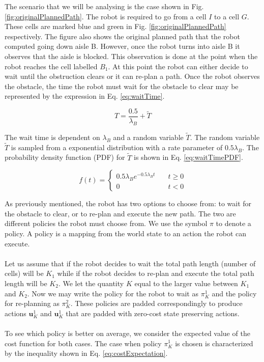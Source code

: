 \documentclass[a4paper,12pt]{article}
\begin{document}
			The scenario that we will be analysing is the case shown in Fig. \ref{fig:originalPlannedPath}. The robot is required to go from a cell $I$ to a cell $G$. These cells are marked blue and green in Fig. \ref{fig:originalPlannedPath} respectively. The figure also shows the original planned path that the robot computed going down aisle B. However, once the robot turns into aisle B it observes that the aisle is blocked. This observation is done at the point when the robot reaches the cell labelled $B_{1}$. At this point the robot can either decide to wait until the obstruction clears or it can re-plan a path. Once the robot observes the obstacle, the time the robot must wait for the obstacle to clear may be represented by the expression in Eq. \ref{eq:waitTime}. 

			\begin{equation}
				T=\frac{0.5}{\lambda_{B}}+\widetilde{T}
				\label{eq:waitTime}
			\end{equation}

			The wait time is dependent on $\lambda_{B}$ and a random variable $\widetilde{T}$. The random variable $\widetilde{T}$ is sampled from a exponential distribution with a rate parameter of $0.5\lambda_{B}$. The probability density function (PDF) for $\widetilde{T}$ is shown in Eq. \ref{eq:waitTimePDF}. 

			\begin{equation}
				f(t) = \left\{
				\begin{array}{ll}
					0.5\lambda_{B} e^{-0.5\lambda_{B} t} & \quad t \geq 0 \\
					0 & \quad t < 0
				\end{array}
				\right.
				\label{eq:waitTimePDF}
			\end{equation}

			As previously mentioned, the robot has two options to choose from: to wait for the obstacle to clear, or to re-plan and execute the new path. The two are different policies the robot must choose from. We use the symbol $\pi$ to denote a policy. A policy is a mapping from the world state to an action the robot can execute.
			\\
			\\
			Let us assume that if the robot decides to wait the total path length (number of cells) will be $K_1$ while if the robot decides to re-plan and execute the total path length will be $K_2$. We let the quantity $K$ equal to the larger value between $K_1$ and $K_2$. Now we may write the policy for the robot to wait as $\pi_{K}^{1}$ and the policy for re-planning as $\pi_{K}^{2}$. These policies are padded correspondingly to produce actions $\textbf{u}_{K}^{1}$ and $\textbf{u}_{K}^{1}$ that are padded with zero-cost state preserving actions.
			\\
			\\
			To see which policy is better on average, we consider the expected value of the cost function for both cases. The case when policy $\pi_{K}^{1}$ is chosen is characterized by the inequality shown in Eq. \ref{eq:costExpectation}.
\end{document}
